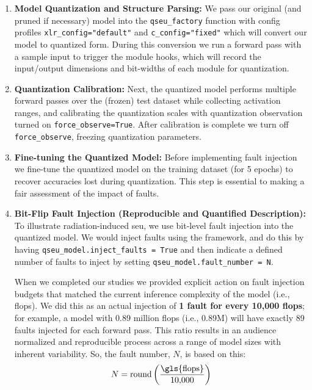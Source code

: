         \begin{enumerate}
        \item \textbf{Model Quantization and Structure Parsing:} 
        We pass our original (and pruned if necessary) model into the \texttt{qseu\_factory} function with config profiles \texttt{xlr\_config="default"} and \texttt{c\_config="fixed"} which will convert our model to quantized form. During this conversion we run a forward pass with a sample input to trigger the module hooks, which will record the input/output dimensions and bit-widths of each module for quantization.
        
        \item \textbf{Quantization Calibration:} 
        Next, the quantized model performs multiple forward passes over the (frozen) test dataset while collecting activation ranges, and calibrating the quantization scales with quantization observation turned on \texttt{force\_observe=True}. After calibration is complete we turn off \texttt{force\_observe}, freezing quantization parameters.
        
        \item \textbf{Fine-tuning the Quantized Model:} 
        Before implementing fault injection we fine-tune the quantized model on the training dataset (for 5 epochs) to recover accuracies lost during quantization. This step is essential to making a fair assessment of the impact of faults.
        
        \item \textbf{Bit-Flip Fault Injection (Reproducible and Quantified Description):} 
        To illustrate radiation-induced \gls{seu}, we use bit-level fault injection into the quantized model. We would inject faults using the framework, and do this by having \texttt{qseu\_model.inject\_faults = True} and then indicate a defined number of faults to inject by setting \texttt{qseu\_model.fault\_number = N}. 
        
        When we completed our studies we provided explicit action on fault injection budgets that matched the current inference complexity of the model (i.e., \gls{flops}). We did this as an actual injection of \textbf{1 fault for every 10,000 \gls{flops}}; for example, a model with 0.89 million \gls{flops} (i.e., 0.89M) will have exactly 89 faults injected for each forward pass. This ratio results in an audience normalized and reproducible process across a range of model sizes with inherent variability. So, the fault number, $N$, is based on this:
        \[
        N = \text{round}\left(\frac{\text{\gls{flops}}}{10{,}000}\right)
        \]
        

\end{enumerate}
